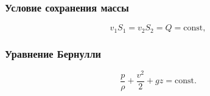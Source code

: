 \documentclass[12pt, a4paper]{article}
\begin{document}
\subsubsection*{Условие сохранения массы}
\[
v_1 S_1 = v_2 S_2 = Q = \text{const},
\]

\subsubsection*{Уравнение Бернулли}
\[
\frac{p}{\rho} + \frac{v^2}{2} + gz = \mathrm{const}.
\]
\end{document}
